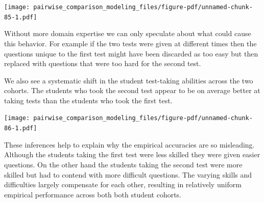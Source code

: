 \documentclass[
  letterpaper,
  DIV=11,
  numbers=noendperiod]{scrartcl}
\newenvironment{Shaded}{\begin{snugshade}}{\end{snugshade}}
\newcommand{\AttributeTok}[1]{\textcolor[rgb]{0.40,0.45,0.13}{#1}}
\newcommand{\ControlFlowTok}[1]{\textcolor[rgb]{0.00,0.23,0.31}{#1}}
\newcommand{\DecValTok}[1]{\textcolor[rgb]{0.68,0.00,0.00}{#1}}
\newcommand{\FloatTok}[1]{\textcolor[rgb]{0.68,0.00,0.00}{#1}}
\newcommand{\FunctionTok}[1]{\textcolor[rgb]{0.28,0.35,0.67}{#1}}
\newcommand{\NormalTok}[1]{\textcolor[rgb]{0.00,0.23,0.31}{#1}}
\newcommand{\OtherTok}[1]{\textcolor[rgb]{0.00,0.23,0.31}{#1}}
\newcommand{\SpecialCharTok}[1]{\textcolor[rgb]{0.37,0.37,0.37}{#1}}
\newcommand{\StringTok}[1]{\textcolor[rgb]{0.13,0.47,0.30}{#1}}
\begin{document}
\texttt{[image: pairwise\_comparison\_modeling\_files/figure-pdf/unnamed-chunk-85-1.pdf]}

Without more domain expertise we can only speculate about what could
cause this behavior. For example if the two tests were given at
different times then the questions unique to the first test might have
been discarded as too easy but then replaced with questions that were
too hard for the second test.

We also see a systematic shift in the student test-taking abilities
across the two cohorts. The students who took the second test appear to
be on average better at taking tests than the students who took the
first test.

\begin{Shaded}
\end{Shaded}

\texttt{[image: pairwise\_comparison\_modeling\_files/figure-pdf/unnamed-chunk-86-1.pdf]}

These inferences help to explain why the empirical accuracies are so
misleading. Although the students taking the first test were less
skilled they were given easier questions. On the other hand the students
taking the second test were more skilled but had to contend with more
difficult questions. The varying skills and difficulties largely
compensate for each other, resulting in relatively uniform empirical
performance across both both student cohorts.
\end{document}

